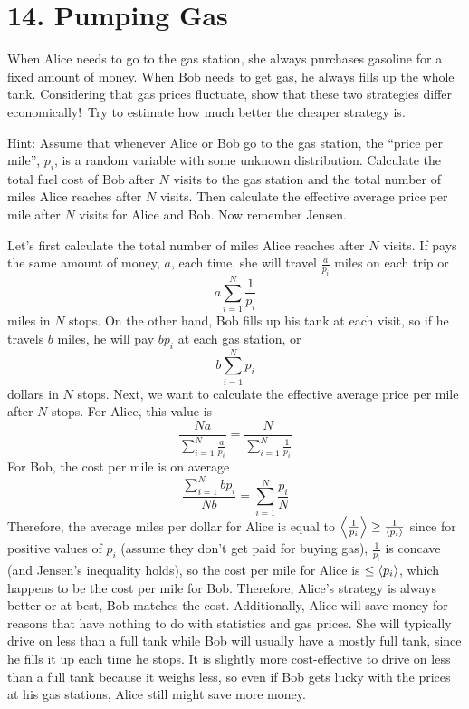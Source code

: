 \documentclass[a4paper,twoside]{article}
\begin{document}
\section*{14. Pumping Gas}
When Alice needs to go to the gas station, she always purchases gasoline for a fixed amount of money. When Bob needs to get gas, he always fills up the whole tank. Considering that gas prices fluctuate, show that these two strategies differ economically!\ Try to estimate how much better the cheaper strategy is.

\begin{note}{Hint:}
    Assume that whenever Alice or Bob go to the gas station, the ``price per mile'', $ p_i $, is a random variable with some unknown distribution. Calculate the total fuel cost of Bob after $ N $ visits to the gas station and the total number of miles Alice reaches after $ N $ visits. Then calculate the effective average price per mile after $ N $ visits for Alice and Bob. Now remember Jensen.
\end{note}
\begin{problem}
    Let's first calculate the total number of miles Alice reaches after $ N $ visits. If pays the same amount of money, $ a $, each time, she will travel $ \frac{a}{p_i} $ miles on each trip or
    \begin{equation}
        a \sum_{i=1}^{N} \frac{1}{p_i}
    \end{equation}
    miles in $ N $ stops. On the other hand, Bob fills up his tank at each visit, so if he travels $ b $ miles, he will pay $ b p_i $ at each gas station, or
    \begin{equation}
        b \sum_{i=1}^{N} p_i
    \end{equation}
    dollars in $ N $ stops. Next, we want to calculate the effective average price per mile after $ N $ stops. For Alice, this value is
    \begin{equation}
        \frac{Na}{\sum_{i=1}^{N} \frac{a}{p_i}} = \frac{N}{\sum_{i=1}^{N} \frac{1}{p_i}}
    \end{equation}
    For Bob, the cost per mile is on average
    \begin{equation}
        \frac{\sum_{i=1}^{N} b p_i}{Nb} = \sum_{i=1}^{N} \frac{p_i}{N}
    \end{equation}
    Therefore, the average miles per dollar for Alice is equal to $ \ev{\frac{1}{p_i}} \geq \frac{1}{\ev{p_i}} $ since for positive values of $ p_i $ (assume they don't get paid for buying gas), $ \frac{1}{p_i} $ is concave (and Jensen's inequality holds), so the cost per mile for Alice is $ \leq \ev{p_i} $, which happens to be the cost per mile for Bob. Therefore, Alice's strategy is always better or at best, Bob matches the cost. Additionally, Alice will save money for reasons that have nothing to do with statistics and gas prices. She will typically drive on less than a full tank while Bob will usually have a mostly full tank, since he fills it up each time he stops. It is slightly more cost-effective to drive on less than a full tank because it weighs less, so even if Bob gets lucky with the prices at his gas stations, Alice still might save more money.
\end{problem}
\end{document}
